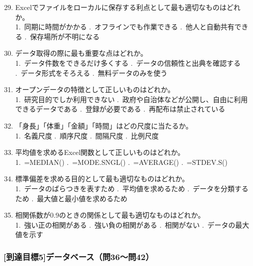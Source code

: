 \documentclass[b4paper,7pt,twocolumn,landscape]{jsarticle}
\begin{document}
\begin{enumerate}
\setcounter{enumi}{28}
\item Excelでファイルをローカルに保存する利点として最も適切なものはどれか。\\
1.~同期に時間がかかる .~オフラインでも作業できる .~他人と自動共有できる .~保存場所が不明になる

\item データ取得の際に最も重要な点はどれか。\\
1.~データ件数をできるだけ多くする .~データの信頼性と出典を確認する .~データ形式をそろえる .~無料データのみを使う

\item オープンデータの特徴として正しいものはどれか。\\
1.~研究目的でしか利用できない .~政府や自治体などが公開し、自由に利用できるデータである .~登録が必要である .~再配布は禁止されている

\item 「身長」「体重」「金額」「時間」はどの尺度に当たるか。\\
1.~名義尺度 .~順序尺度 .~間隔尺度 .~比例尺度

\item 平均値を求めるExcel関数として正しいものはどれか。\\
1.~=MEDIAN() .~=MODE.SNGL() .~=AVERAGE() .~=STDEV.S()

\item 標準偏差を求める目的として最も適切なものはどれか。\\
1.~データのばらつきを表すため .~平均値を求めるため .~データを分類するため .~最大値と最小値を求めるため

\item 相関係数が0.9のときの関係として最も適切なものはどれか。\\
1.~強い正の相関がある .~強い負の相関がある .~相関がない .~データの最大値を示す
\end{enumerate}



\subsubsection*{[到達目標5]データベース（問36〜問42）}
\end{document}
